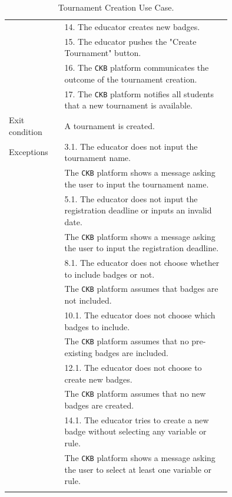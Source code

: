\begin{center}
\begin{longtable}{lp{0.75\linewidth}}
        & 14. The educator creates new badges.\\
        & 15. The educator pushes the "Create Tournament" button.\\
        & 16. The \verb|CKB| platform communicates the outcome of the tournament creation.\\
        & 17. The \verb|CKB| platform notifies all students that a new tournament is available.\\
        \hline
        Exit condition   & A tournament is created.   \\                                                                                                                                                                         
        \hline
        Exceptions   
        & 3.1. The educator does not input the tournament name.\\
            & The \verb|CKB| platform shows a message asking the user to input the tournament name.  \\
        & 5.1. The educator does not input the registration deadline or inputs an invalid date.\\
            & The \verb|CKB| platform shows a message asking the user to input the registration deadline.  \\
        & 8.1. The educator does not choose whether to include badges or not.\\
            & The \verb|CKB| platform assumes that badges are not included.  \\
        & 10.1. The educator does not choose which badges to include.\\
            & The \verb|CKB| platform assumes that no pre-existing badges are included.  \\
        & 12.1. The educator does not choose to create new badges.\\
            & The \verb|CKB| platform assumes that no new badges are created.  \\
        & 14.1. The educator tries to create a new badge without selecting any variable or rule.\\
            & The \verb|CKB| platform shows a message asking the user to select at least one variable or rule.  \\
        \hline
        \caption{Tournament Creation Use Case.}
        \label{tab: tournament_creation_use_case}
    \end{longtable}

\end{center}


